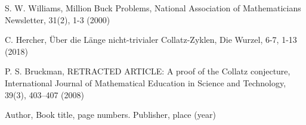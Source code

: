 \begin{thebibliography}{}
%
%
S. W. Williams, Million Buck Problems, National Association of Mathematicians Newsletter, 31(2), 1-3 (2000)

C. Hercher, Über die Länge nicht-trivialer Collatz-Zyklen, Die Wurzel, 6-7, 1-13 (2018)

P. S. Bruckman, RETRACTED ARTICLE: A proof of the Collatz conjecture, International Journal of Mathematical Education in Science and Technology, 39(3), 403–407 (2008)

Author, Book title, page numbers. Publisher, place (year)
\end{thebibliography}


